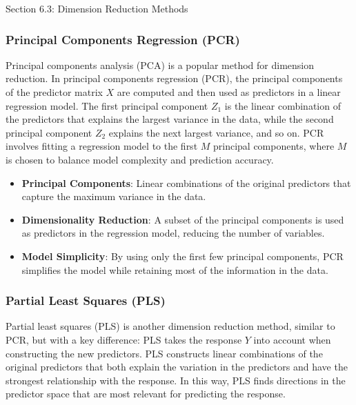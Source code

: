 \begin{notes}{Section 6.3: Dimension Reduction Methods}
    \subsubsection*{Principal Components Regression (PCR)}
    
    Principal components analysis (PCA) is a popular method for dimension reduction. In principal components regression (PCR), the principal components of the predictor matrix \(X\) are computed and then used 
    as predictors in a linear regression model. The first principal component \(Z_1\) is the linear combination of the predictors that explains the largest variance in the data, while the second principal component 
    \(Z_2\) explains the next largest variance, and so on. PCR involves fitting a regression model to the first \(M\) principal components, where \(M\) is chosen to balance model complexity and prediction accuracy.
    
    \begin{highlight}
        \begin{itemize}
            \item \textbf{Principal Components}: Linear combinations of the original predictors that capture the maximum variance in the data.
            \item \textbf{Dimensionality Reduction}: A subset of the principal components is used as predictors in the regression model, reducing the number of variables.
            \item \textbf{Model Simplicity}: By using only the first few principal components, PCR simplifies the model while retaining most of the information in the data.
        \end{itemize}
    \end{highlight}
    
    \subsubsection*{Partial Least Squares (PLS)}
    
    Partial least squares (PLS) is another dimension reduction method, similar to PCR, but with a key difference: PLS takes the response \(Y\) into account when constructing the new predictors. PLS constructs 
    linear combinations of the original predictors that both explain the variation in the predictors and have the strongest relationship with the response. In this way, PLS finds directions in the predictor space 
    that are most relevant for predicting the response.
    

\end{notes}

